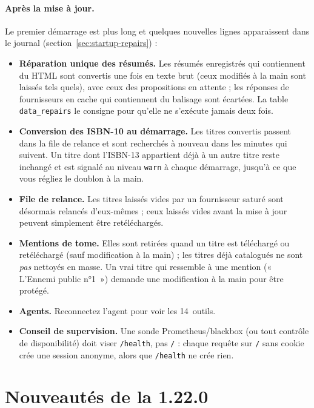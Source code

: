 \paragraph{Après la mise à jour.} Le premier démarrage est plus long
et quelques nouvelles lignes apparaissent dans le journal
(section~\ref{sec:startup-repairs}) :
\begin{itemize}
  \item \textbf{Réparation unique des résumés.} Les résumés enregistrés
        qui contiennent du HTML sont convertis une fois en texte brut
        (ceux modifiés à la main sont laissés tels quels), avec ceux des
        propositions en attente ; les réponses de fournisseurs en cache
        qui contiennent du balisage sont écartées. La table
        \texttt{data\_repairs} le consigne pour qu'elle ne s'exécute
        jamais deux fois.
  \item \textbf{Conversion des ISBN-10 au démarrage.} Les titres
        convertis passent dans la file de relance et sont recherchés à
        nouveau dans les minutes qui suivent. Un titre dont l'ISBN-13
        appartient déjà à un autre titre reste inchangé et est signalé
        au niveau \texttt{warn} à chaque démarrage, jusqu'à ce que vous
        régliez le doublon à la main.
  \item \textbf{File de relance.} Les titres laissés vides par un
        fournisseur saturé sont désormais relancés d'eux-mêmes ; ceux
        laissés vides avant la mise à jour peuvent simplement être
        retéléchargés.
  \item \textbf{Mentions de tome.} Elles sont retirées quand un titre
        est téléchargé ou retéléchargé (sauf modification à la main) ;
        les titres déjà catalogués ne sont \emph{pas} nettoyés en
        masse. Un vrai titre qui ressemble à une mention (« L'Ennemi
        public n°1~») demande une modification à la main pour être
        protégé.
  \item \textbf{Agents.} Reconnectez l'agent pour voir les 14~outils.
  \item \textbf{Conseil de supervision.} Une sonde Prometheus/blackbox
        (ou tout contrôle de disponibilité) doit viser
        \texttt{/health}, pas \texttt{/} : chaque requête sur
        \texttt{/} sans cookie crée une session anonyme, alors que
        \texttt{/health} ne crée rien.
\end{itemize}

\section{Nouveautés de la 1.22.0}\label{sec:whats-new-1.22.0}

